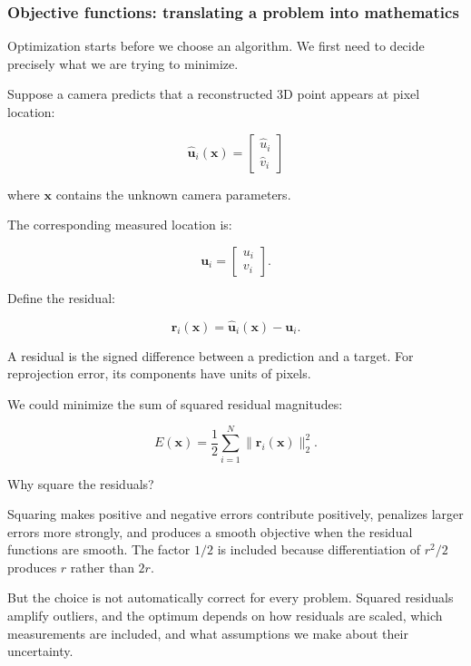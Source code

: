 \hypertarget{02-foundations-ii-ch026-differentiating-executable-computations}{}

\subsubsection{Objective functions: translating a problem into mathematics}\label{02-foundations-ii-ch026-objective-functions-translating-a-problem-into-mathematics}

\hypertarget{02-foundations-ii-ch026-objective-functions-translating-a-problem-into-mathematics}{}

Optimization starts before we choose an algorithm. We first need to decide precisely what we are trying to minimize.

Suppose a camera predicts that a reconstructed 3D point appears at pixel location:

\[
\hat{\mathbf u}_i(\mathbf x)= \begin{bmatrix}\hat u_i\\\hat v_i\end{bmatrix}
\]

where \(\mathbf x\) contains the unknown camera parameters.

The corresponding measured location is:

\[
\mathbf u_i= \begin{bmatrix}u_i\\v_i\end{bmatrix}.
\]

Define the residual:

\[
\boxed{ \mathbf r_i(\mathbf x) = \hat{\mathbf u}_i(\mathbf x)-\mathbf u_i }.
\]

A residual is the signed difference between a prediction and a target. For reprojection error, its components have units of pixels.

We could minimize the sum of squared residual magnitudes:

\[
\boxed{ E(\mathbf x)= \frac12\sum_{i=1}^{N} \|\mathbf r_i(\mathbf x)\|_2^2 }.
\]

Why square the residuals?

Squaring makes positive and negative errors contribute positively, penalizes larger errors more strongly, and produces a smooth objective when the residual functions are smooth. The factor \(1/2\) is included because differentiation of \(r^2/2\) produces \(r\) rather than \(2r\).

But the choice is not automatically correct for every problem. Squared residuals amplify outliers, and the optimum depends on how residuals are scaled, which measurements are included, and what assumptions we make about their uncertainty.

